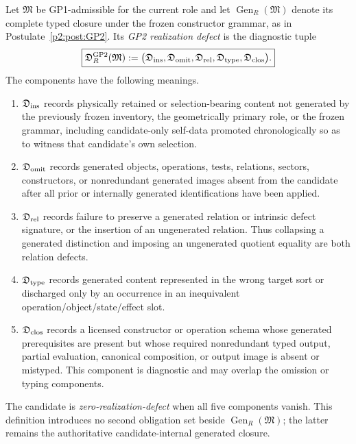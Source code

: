 \documentclass[12pt,a4paper]{article}
\begin{document}
\begin{definition}
\label{p2:def:gp2-realization-defect}
Let \(\mathfrak M\) be GP1-admissible for the current role and let
\(\operatorname{Gen}_R(\mathfrak M)\) denote its complete typed closure under
the frozen constructor grammar, as in Postulate~\ref{p2:post:GP2}.  Its
\emph{GP2 realization defect} is the diagnostic tuple
\[
 \boxed{
 \mathfrak D_R^{\rm GP2}(\mathfrak M)
 :=
 \bigl(
   \mathfrak D_{\rm ins},
   \mathfrak D_{\rm omit},
   \mathfrak D_{\rm rel},
   \mathfrak D_{\rm type},
   \mathfrak D_{\rm clos}
 \bigr).}
\]
The components have the following meanings.
\begin{enumerate}[label=(\roman*),leftmargin=2em]
\item \(\mathfrak D_{\rm ins}\) records physically retained or selection-bearing
content not generated by the previously frozen inventory, the geometrically
primary role, or the frozen grammar, including candidate-only self-data
promoted chronologically so as to witness that candidate's own selection.
\item \(\mathfrak D_{\rm omit}\) records generated objects, operations, tests,
relations, sectors, constructors, or nonredundant generated images absent from
the candidate after all prior or internally generated identifications have
been applied.
\item \(\mathfrak D_{\rm rel}\) records failure to preserve a generated
relation or intrinsic defect signature, or the insertion of an ungenerated
relation.  Thus collapsing a generated distinction and imposing an ungenerated
quotient equality are both relation defects.
\item \(\mathfrak D_{\rm type}\) records generated content represented in the
wrong target sort or discharged only by an occurrence in an inequivalent
operation/object/state/effect slot.
\item \(\mathfrak D_{\rm clos}\) records a licensed constructor or operation
schema whose generated prerequisites are present but whose required
nonredundant typed output, partial evaluation, canonical composition, or output
image is absent or mistyped.  This component is diagnostic and may overlap the
omission or typing components.
\end{enumerate}
The candidate is \emph{zero-realization-defect} when all five components
vanish.  This definition introduces no second obligation set beside
\(\operatorname{Gen}_R(\mathfrak M)\); the latter remains the authoritative
candidate-internal generated closure.
\end{definition}
\end{document}

